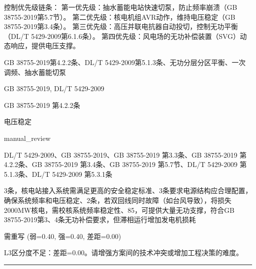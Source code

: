 \documentclass[11pt,a4paper]{ctexart}
\begin{document}
\begin{description}[leftmargin=1.5em,style=nextline,font=\normalfont]
控制优先级链条：
第一优先级：抽水蓄能电站快速切泵，防止频率崩溃（GB 38755-2019第5.7节）。
第二优先级：核电机组AVR动作，维持电压稳定（GB 38755-2019第3.4条）。
第三优先级：高压并联电抗器自动投切，控制无功平衡（DL/T 5429-2009第6.1.6条）。
第四优先级：风电场的无功补偿装置（SVG）动态响应，提供电压支撑。
  \item[KW:] GB 38755-2019第4.2.2条、DL/T 5429-2009第5.1.3条、无功分层分区平衡、一次调频、抽水蓄能切泵
  \item[标准:] GB 38755-2019, DL/T 5429-2009
  \item[条款溯源:] GB 38755-2019 第4.2.2条
  \item[主题:] 电压稳定
  \item[评分方式:] manual\_review
  \item[Rubric条款:] DL/T 5429-2009、GB 38755-2019、GB 38755-2019 第3.3条、GB 38755-2019 第4.2.2条、GB 38755-2019 第3.4条、GB 38755-2019 第5.7节、DL/T 5429-2009 第5.1.3条、DL/T 5429-2009 第5.3.1条
  \item[Rubric判据:] 3条，核电站接入系统需满足更高的安全稳定标准、3条要求电源结构应合理配置，确保系统频率和电压稳定、2条，若双回线同时故障（如台风导致），将损失2000MW核电，需校核系统频率稳定性、85，可提供大量无功支撑，符合GB 38755-2019第3、4条无功补偿要求，但滞相运行增加发电机损耗
  \item[LJ判定:] 需重写 (弱=0.40, 强=0.40, 差距=0.00)
  \item[LJ反馈:] L3区分度不足：差距=0.00。请增强方案间的技术冲突或增加工程决策的难度。
\end{description}
\vspace{4pt}
\hrule
\vspace{6pt}
\end{document}
